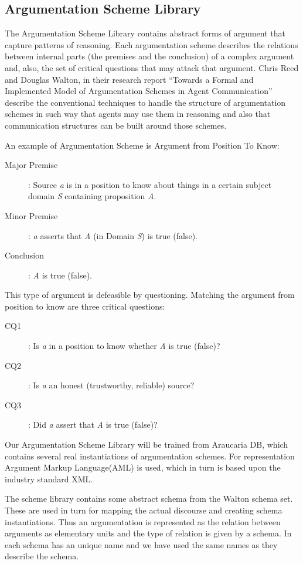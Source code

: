 \subsection {Argumentation Scheme Library}
\par
The Argumentation Scheme Library contains abstract forms of argument that capture patterns of reasoning. Each argumentation scheme describes the relations between internal parts (the premises and the conclusion) of a complex argument and, also, the set of critical questions that may attack that argument. Chris Reed and Douglas Walton, in their research report ``Towards a Formal and Implemented Model of Argumentation Schemes in Agent Communication''\cite{reed} describe the conventional techniques to handle the structure of argumentation schemes in such way that agents may use them in reasoning and also that communication structures can be built around those schemes.
\par
An example of Argumentation Scheme is Argument from Position To Know:
\begin{description}
\item[Major Premise]: Source \emph{a} is in a position to know about things in a certain subject domain \emph{S} containing proposition \emph{A}.
\item[Minor Premise]: \emph{a} asserts that \emph{A} (in Domain \emph{S}) is true (false).
\item[Conclusion]: \emph{A} is true (false).
\end{description}
This type of argument is defeasible by questioning. Matching the argument from position to know are three critical questions:
\begin{description}
\item[CQ1]: Is \emph{a} in a position to know whether \emph{A} is true (false)?
\item[CQ2]: Is \emph{a} an honest (trustworthy, reliable) source?
\item[CQ3]: Did \emph{a} assert that \emph{A} is true (false)?
\end{description}
\par
Our Argumentation Scheme Library will be trained from Araucaria DB, which contains several real instantiations of argumentation schemes. For representation Argument Markup Language(AML)\label{AML} is used, which in turn is based upon the industry standard XML.
\par
The scheme library contains some abstract schema from the Walton schema set\cite{reed}. These are used in turn for mapping the actual discourse and creating schema instantiations. Thus an argumentation is represented as the relation between arguments as elementary units and the type of relation is given by a schema. In\cite{reed} each schema has an unique name and we have used the same names as they describe the schema.

